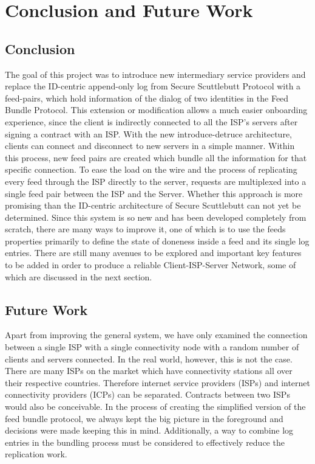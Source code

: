 \chapter{Conclusion and Future Work}
\section{Conclusion}
The goal of this project was to introduce new intermediary service providers and replace the ID-centric append-only log from Secure Scuttlebutt Protocol with a feed-pairs, which hold information of the dialog of two identities in the Feed Bundle Protocol. This extension or modification allows a much easier onboarding experience, since the client is indirectly connected to all the ISP’s servers after signing a contract with an ISP. With the new introduce-detruce architecture, clients can connect and disconnect to new servers in a simple manner. Within this process, new feed pairs are created which bundle all the information for that specific connection. To ease the load on the wire and the process of replicating every feed through the ISP directly to the server, requests are multiplexed into a single feed pair between the ISP and the Server. Whether this approach is more promising than the ID-centric architecture of Secure Scuttlebutt can not yet be determined. Since this system is so new and has been developed completely from scratch, there are many ways to improve it, one of which is to use the feeds properties primarily to define the state of doneness inside a feed and its single log entries. There are still many avenues to be explored and important key features to be added in order to produce a reliable Client-ISP-Server Network, some of which are discussed in the next section.

\section{Future Work}
Apart from improving the general system, we have only examined the connection between a single ISP with a single connectivity node with a random number of clients and servers connected. In the real world, however, this is not the case. There are many ISPs on the market which have connectivity stations all over their respective countries. Therefore internet service providers (ISPs) and internet connectivity providers (ICPs) can be separated. Contracts between two ISPs would also be conceivable. In the process of creating the simplified version of the feed bundle protocol, we always kept the big picture in the foreground and decisions were made keeping this in mind. Additionally, a way to combine log entries in the bundling process must be considered to effectively reduce the replication work.

